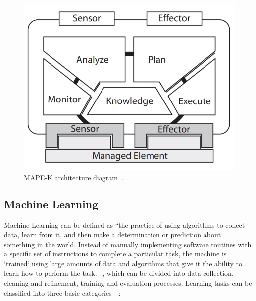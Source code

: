 \documentclass[runningheads]{llncs}
\begin{document}
\begin{figure}[H]
\centering
\includegraphics[scale=0.5]{images/MAPE-K.png}
\caption {MAPE-K architecture diagram~\citep{Abbas_2010}.}
\label{fig:MAPEK}
\end{figure}

\subsection{Machine Learning}
Machine Learning can be defined as “the practice of using algorithms to collect data, learn from it, and then make a determination or prediction about something in the world. Instead of manually implementing software routines with a specific set of instructions to complete a particular task, the machine is `trained` using large amounts of data and algorithms that give it the ability to learn how to perform the task. ~\citep{Copeland_2016}, which can be divided into data collection, cleaning and refinement, training and evaluation processes. Learning tasks can be classified into three basic categories~\citep{MLWikipedia_2021}~\citep{MLSAS_2021}:
\end{document}

